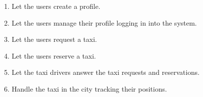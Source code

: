 \begin{enumerate}
    \item Let the users create a profile.  \label{g-register}
    \item Let the users manage their profile logging in into the system.  \label{g-manage}
    \item Let the users request a taxi.  \label{g-request}
    \item Let the users reserve a taxi.  \label{g-reserve}
    \item Let the taxi drivers answer the taxi requests and reservations.  \label{g-answer}
    \item Handle the taxi in the city tracking their positions.  \label{g-handle}
\end{enumerate} 
